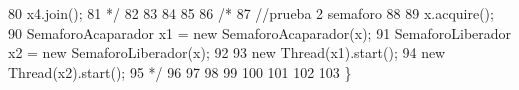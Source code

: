 \begin{DoxyCode}
80 \textcolor{comment}{        x4.join();}
81 \textcolor{comment}{        */}
82         
83         
84         
85         
86         \textcolor{comment}{/*}
87 \textcolor{comment}{        //prueba 2 semaforo}
88 \textcolor{comment}{        }
89 \textcolor{comment}{        x.acquire();}
90 \textcolor{comment}{        SemaforoAcaparador x1 = new SemaforoAcaparador(x);}
91 \textcolor{comment}{        SemaforoLiberador x2 = new SemaforoLiberador(x);}
92 \textcolor{comment}{        }
93 \textcolor{comment}{        new Thread(x1).start();}
94 \textcolor{comment}{        new Thread(x2).start();}
95 \textcolor{comment}{        */}
96         
97         
98         
99         
100         
101         
102         
103     \}
\end{DoxyCode}
